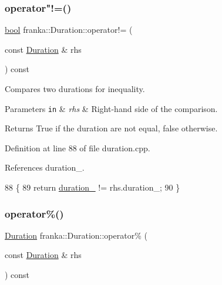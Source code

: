 \subsubsection{\texorpdfstring{operator"!=()}{operator!=()}}
{\footnotesize\ttfamily \hyperlink{classbool}{bool} franka\+::\+Duration\+::operator!= (\begin{DoxyParamCaption}\item[{const \hyperlink{classfranka_1_1Duration}{Duration} \&}]{rhs }\end{DoxyParamCaption}) const\hspace{0.3cm}{\ttfamily [noexcept]}}

Compares two durations for inequality.


\begin{DoxyParams}[1]{Parameters}
\mbox{\tt in}  & {\em rhs} & Right-\/hand side of the comparison.\\
\hline
\end{DoxyParams}
\begin{DoxyReturn}{Returns}
True if the duration are not equal, false otherwise. 
\end{DoxyReturn}


Definition at line 88 of file duration.\+cpp.



References duration\+\_\+.


\begin{DoxyCode}
88                                                             \{
89   \textcolor{keywordflow}{return} \hyperlink{classfranka_1_1Duration_ae446c403b200f0dbf92fb51ca21e82ff}{duration\_} != rhs.duration\_;
90 \}
\end{DoxyCode}
\mbox{\label{classfranka_1_1Duration_a5e472345c1bec29b645bee938932fdb1}} 
\subsubsection{\texorpdfstring{operator\%()}{operator\%()}\hspace{0.1cm}{\footnotesize\ttfamily [1/2]}}
{\footnotesize\ttfamily \hyperlink{classfranka_1_1Duration}{Duration} franka\+::\+Duration\+::operator\% (\begin{DoxyParamCaption}\item[{const \hyperlink{classfranka_1_1Duration}{Duration} \&}]{rhs }\end{DoxyParamCaption}) const\hspace{0.3cm}{\ttfamily [noexcept]}}

